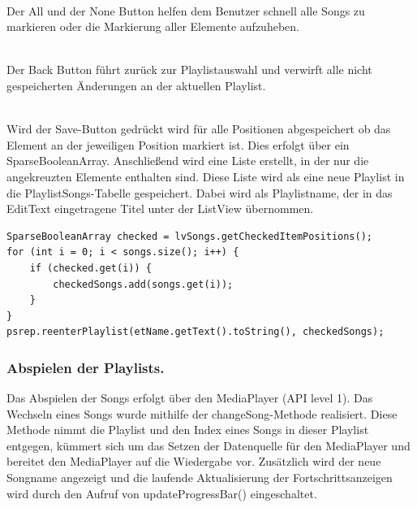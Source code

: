 \documentclass[FIPLY_base.tex]{subfiles}
\begin{document}
\ \\
Der All und der None Button helfen dem Benutzer schnell alle Songs zu markieren oder die Markierung aller Elemente aufzuheben.

\ \\
Der Back Button führt zurück zur Playlistauswahl und verwirft alle nicht gespeicherten Änderungen an der aktuellen Playlist.

\ \\
Wird der Save-Button gedrückt wird für alle Positionen abgespeichert ob das Element an der jeweiligen Position markiert ist. Dies erfolgt über ein SparseBooleanArray. 
Anschließend wird eine Liste erstellt, in der nur die angekreuzten Elemente enthalten sind. Diese Liste wird als eine neue Playlist in die PlaylistSongs-Tabelle gespeichert. 
Dabei wird als Playlistname, der in das EditText eingetragene Titel unter der ListView übernommen.

\begin{lstlisting}[caption={Speichern der Songverweise in eine ArrayList von HashMaps},label=DescriptiveLabel]
SparseBooleanArray checked = lvSongs.getCheckedItemPositions();
for (int i = 0; i < songs.size(); i++) {
    if (checked.get(i)) {
        checkedSongs.add(songs.get(i));
    }
}
psrep.reenterPlaylist(etName.getText().toString(), checkedSongs);
\end{lstlisting}


\subsubsection { Abspielen der Playlists.}
Das Abspielen der Songs erfolgt über den MediaPlayer (API level 1). \newline
Das Wechseln eines Songs wurde mithilfe der changeSong-Methode realisiert. \newline
Diese Methode nimmt die Playlist und den Index eines Songs in dieser Playlist entgegen, kümmert sich um das Setzen der Datenquelle für den MediaPlayer und bereitet den MediaPlayer auf die Wiedergabe vor. 
Zusätzlich wird der neue Songname angezeigt und die laufende Aktualisierung der Fortschrittsanzeigen wird durch den Aufruf von updateProgressBar() eingeschaltet. 
\end{document}
